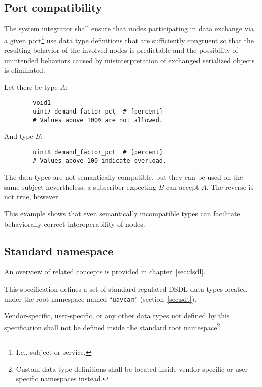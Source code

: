 \subsection{Port compatibility}


The system integrator shall ensure that nodes participating in data exchange via a given port\footnote{%
    I.e., subject or service.
} use data type definitions that are sufficiently congruent so that the resulting behavior of the involved nodes
is predictable and the possibility of unintended behaviors caused by misinterpretation of exchanged serialized
objects is eliminated.

\begin{remark}
    Let there be type $A$:

    \begin{verbatim}
        void1
        uint7 demand_factor_pct  # [percent]
        # Values above 100% are not allowed.
    \end{verbatim}

    And type $B$:

    \begin{verbatim}
        uint8 demand_factor_pct  # [percent]
        # Values above 100 indicate overload.
    \end{verbatim}

    The data types are not semantically compatible, but they can be used on the same subject nevertheless:
    a subscriber expecting $B$ can accept $A$.
    The reverse is not true, however.

    This example shows that even semantically incompatible types can facilitate
    behaviorally correct interoperability of nodes.
\end{remark}

\subsection{Standard namespace}

An overview of related concepts is provided in chapter~\ref{sec:dsdl}.

This specification defines a set of standard regulated DSDL data types located under
the root namespace named ``\verb"uavcan"'' (section~\ref{sec:sdt}).

Vendor-specific, user-specific, or any other data types not defined by this specification
shall not be defined inside the standard root namespace\footnote{Custom data type definitions shall be located
inside vendor-specific or user-specific namespaces instead.}.
